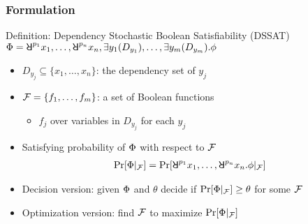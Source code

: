 \begin{frame}
  \frametitle{Formulation}
  \begin{block}{Definition: Dependency Stochastic Boolean Satisfiability (DSSAT)}
    $\Qf=\random{p_1} x_1, \ldots, \random{p_n} x_n, \exists y_1(D_{y_1}), \ldots, \exists y_m(D_{y_m}).\pf$
    \begin{itemize}
      \item $D_{y_j} \subseteq \{x_1,\ldots,x_n\}$: the \alert{dependency set} of $y_j$
      \item $\mathcal{F}=\{f_1,\ldots,f_m\}$: a set of Boolean functions
            \begin{itemize}
              \item $f_j$ over variables in $D_{y_j}$ for each $y_j$
            \end{itemize}
      \item Satisfying probability of $\Phi$ with respect to $\mathcal{F}$
            \begin{align*}
              \spb{\pcf{\Qf}{\skf}}=\Pr[\random{p_1} x_1, \ldots, \random{p_n} x_n.\pf|_{\skf}]
            \end{align*}
      \item Decision version: given $\Phi$ and $\theta$ decide if $\Pr[\Phi|_{\mathcal{F}}] \geq \theta$ for some $\mathcal{F}$
      \item Optimization version: find $\mathcal{F}$ to maximize $\Pr[\Phi|_{\mathcal{F}}]$
    \end{itemize}
  \end{block}
\end{frame}

